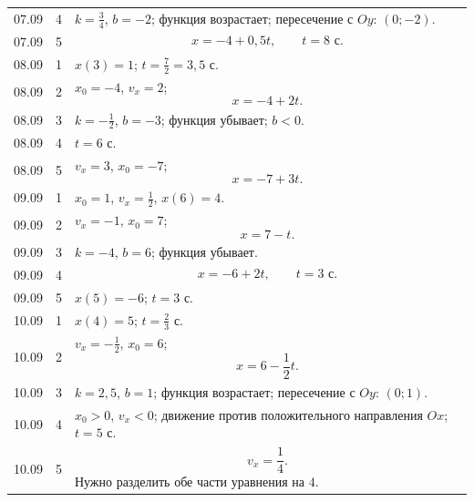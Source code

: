 \documentclass[a4paper,12pt]{article}
\begin{document}
\begin{longtable}{@{}p{1.6cm}p{0.8cm}p{\dimexpr\linewidth-3.0cm\relax}@{}}
07.09 & 4 &
\(\displaystyle k=\frac34\), \(b=-2\); функция возрастает; пересечение с \(Oy\): \((0;-2)\). \\

07.09 & 5 &
\[
x=-4+0{,}5t,\qquad t=8\text{ с}.
\] \\

\midrule

08.09 & 1 &
\(x(3)=1\);
\(\displaystyle t=\frac72=3{,}5\text{ с}\). \\

08.09 & 2 &
\(x_0=-4\), \(v_x=2\);
\[
x=-4+2t.
\] \\

08.09 & 3 &
\(\displaystyle k=-\frac12\), \(b=-3\); функция убывает; \(b<0\). \\

08.09 & 4 &
\(t=6\text{ с}\). \\

08.09 & 5 &
\(v_x=3\), \(x_0=-7\);
\[
x=-7+3t.
\] \\

\midrule

09.09 & 1 &
\(\displaystyle x_0=1\), \(\displaystyle v_x=\frac12\), \(x(6)=4\). \\

09.09 & 2 &
\(v_x=-1\), \(x_0=7\);
\[
x=7-t.
\] \\

09.09 & 3 &
\(k=-4\), \(b=6\); функция убывает. \\

09.09 & 4 &
\[
x=-6+2t,\qquad t=3\text{ с}.
\] \\

09.09 & 5 &
\(x(5)=-6\);
\(t=3\text{ с}\). \\

\midrule

10.09 & 1 &
\(x(4)=5\);
\(\displaystyle t=\frac23\text{ с}\). \\

10.09 & 2 &
\(\displaystyle v_x=-\frac12\), \(x_0=6\);
\[
x=6-\frac12t.
\] \\

10.09 & 3 &
\(k=2{,}5\), \(b=1\); функция возрастает; пересечение с \(Oy\): \((0;1)\). \\

10.09 & 4 &
\(x_0>0\), \(v_x<0\); движение против положительного направления \(Ox\);
\(t=5\text{ с}\). \\

10.09 & 5 &
\[
\boxed{v_x=\frac14}.
\]
Нужно разделить обе части уравнения на \(4\). \\


\end{longtable}
\end{document}
